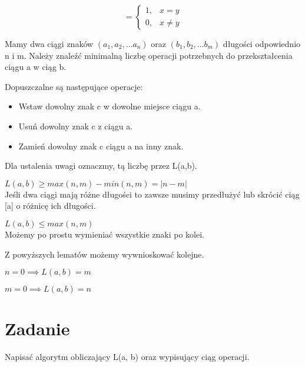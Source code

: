 \documentclass[paper=a4, fontsize=11pt]{article}
\begin{document}
\begin{mydef}
\begin{equation}
[x = y] = 
\begin{cases}
1, & x = y \\
0, & x \neq y
\end{cases}
\end{equation}
\end{mydef}

\begin{mydef}
Mamy dwa ciągi znaków $(a_1, a_2, \dots a_{n})$ oraz $(b_1, b_2, \dots b_{m})$ długości odpowiednio n i m. Należy znaleźć minimalną liczbę operacji potrzebnych do przekształcenia ciągu a w ciąg b.

Dopuszczalne są następujące operacje:
\begin{itemize}
\item Wstaw dowolny znak c w dowolne miejsce ciągu a.
\item Usuń dowolny znak c z ciągu a.
\item Zamień dowolny znak c ciągu a na inny znak.
\end{itemize}

Dla ustalenia uwagi oznaczmy, tą liczbę przez L(a,b).
\begin{lemma} $L(a, b) \ge max(n, m) - min(n, m) = |n - m|$ \\ 
Jeśli dwa ciągi mają różne długości to zawsze musimy przedłużyć lub skrócić ciąg [a] o różnicę ich długości.
\end{lemma}
\begin{lemma} $L(a,b) \le max(n, m)$ \\
Możemy po prostu wymieniać wszystkie znaki po kolei.
\end{lemma}

Z powyższych lematów możemy wywnioskować kolejne.
\begin{lemma} $ n = 0 \implies L(a, b) = m$ 
\end{lemma}
\begin{lemma} $ m = 0 \implies L(a, b) = n$
\end{lemma}

\end{mydef}
\section{Zadanie}
Napisać algorytm obliczający L(a, b) oraz wypisujący ciąg operacji.
\end{document}
